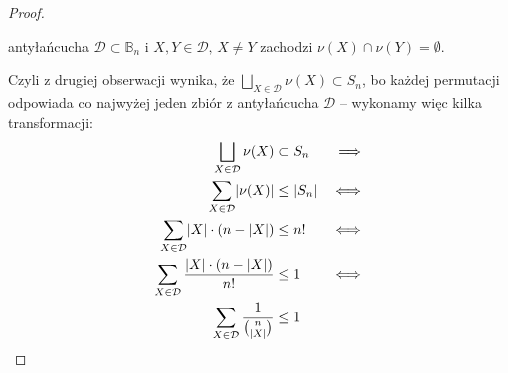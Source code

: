 \begin{proof}
\begin{enumerate}
		      antyłańcucha \(\mathcal{D} \subset \mathbb B_n\) i \(X, Y \in \mathcal{D},\, X \neq Y\)
		      zachodzi \(\nu(X) \cap \nu(Y) = \emptyset\).
	\end{enumerate}
	Czyli z drugiej obserwacji wynika, że \(\bigsqcup_{X \in \mathcal{D}} \nu(X) \subset S_n\), bo każdej permutacji
	odpowiada co najwyżej jeden zbiór z antyłańcucha \(\mathcal{D}\) -- wykonamy więc kilka transformacji:
	\begin{align*}
		\bigsqcup_{X \in \mathcal{D}} \nu(X)                              & \subset S_n     & \implies \\
		\sum_{X \in \mathcal{D}} \card{\nu(X)}                            & \leq \card{S_n} & \iff     \\
		\sum_{X \in \mathcal{D}} \card{X} \cdot (n - \card{X})            & \leq n!         & \iff     \\
		\sum_{X \in \mathcal{D}} \frac{\card{X} \cdot (n - \card{X})}{n!} & \leq 1          & \iff     \\
		\sum_{X \in \mathcal{D}} \frac{1}{\binom{n}{\card{X}}}            & \leq 1
	\end{align*}
\end{proof}
